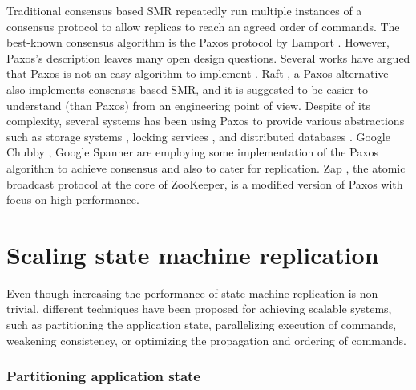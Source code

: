 Traditional consensus based SMR repeatedly run multiple instances of a consensus
protocol to allow replicas to reach an agreed order of commands. The best-known
consensus algorithm is the Paxos protocol by Lamport \cite{Lam98}. However,
Paxos's description leaves many open design questions. Several works have argued
that Paxos is not an easy algorithm to implement \cite{paxoslive,
Kirsch:2008paxos}. Raft \cite{184040}, a Paxos alternative also implements
consensus-based SMR, and it is suggested to be easier to understand (than Paxos)
from an engineering point of view. Despite of its complexity, several systems
has been using Paxos to provide various abstractions such as storage systems
\cite{Bolosky:20011paxos}, locking services \cite{Mike:2006chubby}, and
distributed databases \cite{Baker:2011megastore}. Google Chubby
\cite{Mike:2006chubby}, Google Spanner \cite{corbett2013spanner} are employing
some implementation of the Paxos algorithm to achieve consensus and also to
cater for replication. Zap \cite{Hunt:2010zoo}, the atomic broadcast protocol at
the core of ZooKeeper, is a modified version of Paxos with focus on
high-performance.

\section{Scaling state machine replication}

Even though increasing the performance of state machine replication is
non-trivial, different techniques have been proposed for achieving scalable
systems, such as partitioning the application state, parallelizing execution of
commands, weakening consistency,  or optimizing the propagation and ordering of
commands. 

\subsubsection{Partitioning application state}

